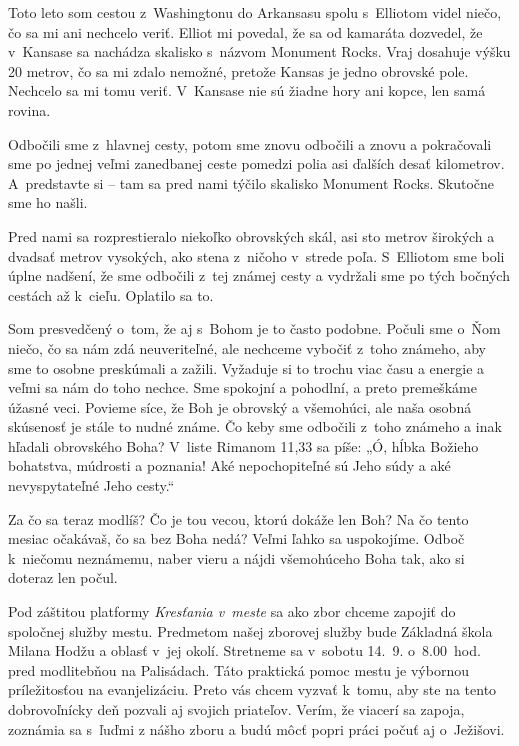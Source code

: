 


Toto leto som cestou z~Washingtonu do Arkansasu spolu s~Elliotom videl niečo, čo sa mi ani nechcelo veriť. Elliot mi povedal, že sa od kamaráta dozvedel, že v~Kansase sa nachádza skalisko s~názvom Monument Rocks. Vraj dosahuje výšku 20 metrov, čo sa mi zdalo nemožné, pretože Kansas je jedno obrovské pole. Nechcelo sa mi tomu veriť. V~Kansase nie sú žiadne hory ani kopce, len samá rovina.

Odbočili sme z~hlavnej cesty, potom sme znovu odbočili a znovu a pokračovali sme po jednej veľmi zanedbanej ceste pomedzi polia asi ďalších desať kilometrov. A~predstavte si -- tam sa pred nami týčilo skalisko Monument Rocks. Skutočne sme ho našli.

Pred nami sa rozprestieralo niekoľko obrovských skál, asi sto metrov širokých a dvadsať metrov vysokých, ako stena z~ničoho v~strede poľa. S~Elliotom sme boli úplne nadšení, že sme odbočili z~tej známej cesty a vydržali sme po tých bočných cestách až k~cieľu. Oplatilo sa to.

Som presvedčený o~tom, že aj s~Bohom je to často podobne. Počuli sme o~Ňom niečo, čo sa nám zdá neuveriteľné, ale nechceme vybočiť z~toho známeho, aby sme to osobne preskúmali a zažili. Vyžaduje si to trochu viac času a energie a veľmi sa nám do toho nechce. Sme spokojní a pohodlní, a preto premeškáme úžasné veci. Povieme síce, že Boh je obrovský a všemohúci, ale naša osobná skúsenosť je stále to nudné známe. Čo keby sme odbočili z~toho známeho a inak hľadali obrovského Boha? V~liste Rimanom 11,33 sa píše: „Ó, hĺbka Božieho bohatstva, múdrosti a poznania! Aké nepochopiteľné sú Jeho súdy a aké nevyspytateľné Jeho cesty.“

Za čo sa teraz modlíš? Čo je tou vecou, ktorú dokáže len Boh? Na čo tento mesiac očakávaš, čo sa bez Boha nedá? Veľmi ľahko sa uspokojíme. Odboč k~niečomu neznámemu, naber vieru a nájdi všemohúceho Boha tak, ako si doteraz len počul.



Pod záštitou platformy {\it Kresťania v~meste} sa ako zbor chceme zapojiť do spoločnej služby mestu. Predmetom našej zborovej služby bude Základná škola Milana Hodžu a oblasť v~jej okolí. Stretneme sa v~sobotu 14.~9. o~8.00~hod. pred modlitebňou na Palisádach. Táto praktická pomoc mestu je výbornou príležitosťou na evanjelizáciu. Preto vás chcem vyzvať k~tomu, aby ste na tento dobrovoľnícky deň pozvali aj svojich priateľov. Verím, že viacerí sa zapoja, zoznámia sa s~ľuďmi z nášho zboru a budú môcť popri práci počuť aj o~Ježišovi.

